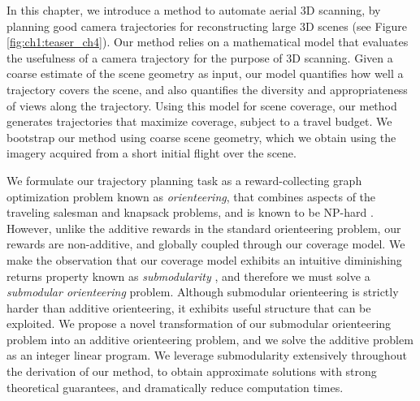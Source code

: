 In this chapter, we introduce a method to automate aerial 3D scanning, by planning good camera trajectories for reconstructing large 3D scenes (see Figure \ref{fig:ch1:teaser_ch4}).
Our method relies on a mathematical model that evaluates the usefulness of a camera trajectory for the purpose of 3D scanning.
Given a coarse estimate of the scene geometry as input, our model quantifies how well a trajectory covers the scene, and also quantifies the diversity and appropriateness of views along the trajectory.
Using this model for scene coverage, our method generates trajectories that maximize coverage, subject to a travel budget.
We bootstrap our method using coarse scene geometry, which we obtain using the imagery acquired from a short initial flight over the scene. 



We formulate our trajectory planning task as a reward-collecting graph optimization problem known as \textit{orienteering}, that combines aspects of the traveling salesman and knapsack problems, and is known to be NP-hard \cite{gunawan:2016,vansteenwegena:2011}.
However, unlike the additive rewards in the standard orienteering problem, our rewards are non-additive, and globally coupled through our coverage model.
We make the observation that our coverage model exhibits an intuitive diminishing returns property known as \textit{submodularity} \cite{krause:2014}, and therefore we must solve a \textit{submodular orienteering} problem.
Although submodular orienteering is strictly harder than additive orienteering, it exhibits useful structure that can be exploited.
We propose a novel transformation of our submodular orienteering problem into an additive orienteering problem, and we solve the additive problem as an integer linear program. We leverage submodularity extensively throughout the derivation of our method, to obtain approximate solutions with strong theoretical guarantees, and dramatically reduce computation times.

